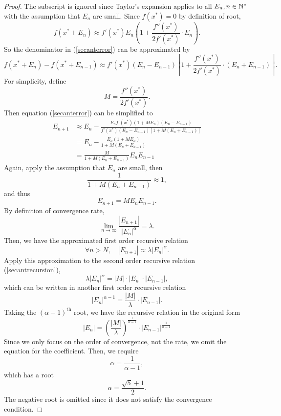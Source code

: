 \begin{enumerate}
\begin{proof}
		The subscript is ignored since Taylor's expansion applies to all \(E_n,n\in\mathbb{N}^*\) with the assumption that \(E_n\) are small.
		Since \(f(x^*)=0\) by definition of root,
		\[ f(x^*+E_n)\approx f'(x^*)E_n \left(1+\frac{f''(x^*)}{2f'(x^*)}\cdot E_n \right). \]
		So the denominator in (\ref{secanterror}) can be approximated by
		\[ f(x^*+E_n)-f(x^*+E_{n-1})\approx f'(x^*)(E_n-E_{n-1}) \left[1+\frac{f''(x^*)}{2f'(x^*)}\cdot (E_n+E_{n-1}) \right]. \]
		For simplicity, define
		\[ M=\frac{f''(x^*)}{2f'(x^*)}. \]
		Then equation (\ref{secanterror}) can be simplified to
		\begin{align*}
			E_{n+1}&\approx E_n-\frac{E_n f'(x^*)(1+M E_n)(E_n-E_{n-1})}{f'(x^*)(E_n-E_{n-1})[1+M(E_n+E_{n-1})]}\\
			&=E_n-\frac{E_n (1+M E_n)}{1+M(E_n+E_{n-1})}\\
			&=\frac{M}{1+M(E_n+E_{n-1})}E_nE_{n-1}
		\end{align*}
		Again, apply the assumption that \(E_n\) are small, then
		\[ \frac{1}{1+M(E_n+E_{n-1})}\approx 1, \]
		and thus
		\begin{equation}
		\label{secantrecursion}
		E_{n+1}=M E_n E_{n-1}.
		\end{equation}
		By definition of convergence rate,
		\[ \lim_{n\to\infty}\frac{|E_{n+1}|}{|E_n|^\alpha}=\lambda. \]
		Then, we have the approximated first order recursive relation
		\[ \forall n>N,\quad|E_{n+1}|\approx \lambda|E_n|^\alpha. \]
		Apply this approximation to the second order recursive relation (\ref{secantrecursion}),
		\[ \lambda|E_n|^\alpha=|M|\cdot|E_n|\cdot|E_{n-1}|, \]
		which can be written in another first order recursive relation
		\[ |E_n|^{\alpha-1}=\frac{|M|}{\lambda}\cdot|E_{n-1}|. \]
		Taking the \((\alpha-1)^{\text{th}}\) root, we have the recursive relation in the original form
		\[ |E_n|=\left(\frac{|M|}{\lambda}\right)^{\frac{1}{\alpha-1}}\cdot|E_{n-1}|^{\frac{1}{\alpha-1}} \]
		Since we only focus on the order of convergence, not the rate, we omit the equation for the coefficient.
		Then, we require
		\[  \alpha=\frac{1}{\alpha-1}, \]
		which has a root
		\[ \alpha=\frac{\sqrt{5}+1}{2}. \]
		The negative root is omitted since it does not satisfy the convergence condition.
	\end{proof}
\end{enumerate}


